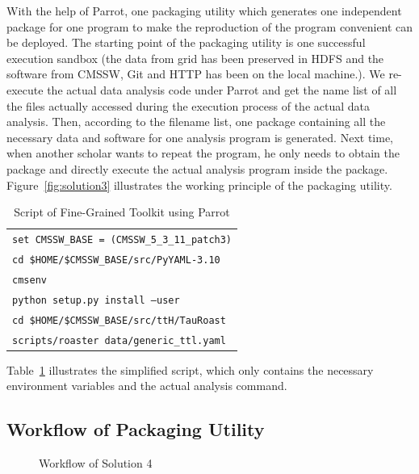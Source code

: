 \documentclass{acm_proc_article-sp}
\begin{document}
With the help of Parrot, one packaging utility which generates one independent
package for one program to make the reproduction of the program convenient can
be deployed. The starting point of the packaging utility is one successful execution
sandbox (the data from grid has been preserved in HDFS and the software from
CMSSW, Git and HTTP has been on the local machine.). We re-execute the actual
data analysis code under Parrot and get the name list of all the files actually
accessed during the execution process of the actual data analysis. Then,
according to the filename list, one package containing all the necessary data
and software for one analysis program is generated. Next time, when another
scholar wants to repeat the program, he only needs to obtain the package and
directly execute the actual analysis program inside the package. 
Figure~\ref{fig:solution3} illustrates the working principle of the packaging utility.

\begin{table}
    \centering
    \begin{tabular}{|l|}
        \hline
        {\tt set CMSSW\_BASE = (CMSSW\_5\_3\_11\_patch3)} \\
        {\tt cd \$HOME/\$CMSSW\_BASE/src/PyYAML-3.10}\\
        {\tt cmsenv} \\
        {\tt python setup.py install --user} \\
        {\tt cd \$HOME/\$CMSSW\_BASE/src/ttH/TauRoast}\\
        {\tt scripts/roaster data/generic\_ttl.yaml} \\
        \hline
    \end{tabular}
    \caption{Script of Fine-Grained Toolkit using Parrot}
    \label{table:parrot-script}
\end{table}

Table~\ref{table:parrot-script} illustrates
the simplified script, which
only contains the necessary environment variables and the
actual analysis command.

\subsection{Workflow of Packaging Utility}
\begin{figure}
\centering
{}
\caption{Workflow of Solution 4}
\label{fig:workflow-parrot}
\end{figure}
\end{document}
